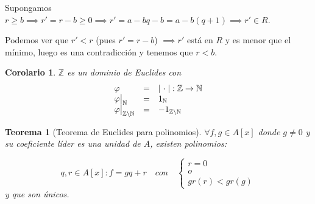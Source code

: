 \documentclass[11pt, a4paper, titlepage]{article}
\makeatletter
\newif\IfInSansMode
\let\oldsf\sffamily
\renewcommand*{\sffamily}{\oldsf\mathversion{sans}\InSansModetrue}
\let\oldnorm\normalfont
\renewcommand*{\normalfont}{\oldnorm\InSansModefalse\mathversion{normal}}
\renewenvironment{proof}[1][\proofname] {\vspace{-15pt}\par\pushQED{\qed}\normalfont\topsep6\p@\@plus6\p@\relax\trivlist\item[\hskip\labelsep\it#1\@addpunct{.}]\ignorespaces}{\popQED\endtrivlist\@endpefalse}
\providecommand{\ent}{\mathbb{Z}}
\providecommand{\nat}{\mathbb{N}}
\providecommand{\abs}[1]{\lvert#1\rvert}
\newcommand\restr[2]{{%
  \left.\kern-\nulldelimiterspace %
  #1 %
  \vphantom{\big|} %
  \right|_{#2} %
  }}
\renewenvironment{proof}[1][\proofname] {\par\pushQED{\qed}\normalfont\topsep6\p@\@plus6\p@\relax\trivlist\item[\hskip\labelsep\itshape\sffamily#1\@addpunct{.}]\ignorespaces}{\popQED\endtrivlist\@endpefalse}
\theoremstyle{theorem-style}
\newtheorem{nth}{Teorema}[section]
\newtheorem{ncor}{Corolario}[section]
\theoremstyle{definition-style}
\theoremstyle{remark-style}
\theoremstyle{example-style}
\makeatother
\begin{document}
\begin{proof}
\begin{itemize}
Supongamos $ r \geq b\implies r' = r-b \geq 0 \implies r' = a-bq -b = a -b(q+1)\implies r' \in R$.

Podemos ver que $r' < r$ (pues $r'=r-b$) $\implies  r'$ está en $R$ y es menor que el mínimo, luego es una contradicción y tenemos que $r < b$.

\end{itemize}




\end{proof}

\begin{ncor}
$\ent$ es un dominio de Euclides con
  \[
  \begin{array}{lll}
  \varphi & = & \abs{\;\cdot\;}: \ent \to \nat \\
  \restr{\varphi}{\nat} & = & 1_{\nat} \\
  \restr{\varphi}{\ent \setminus \nat} & = & -1_{\ent \setminus \nat}
\end{array}
\]
\end{ncor}

\begin{nth}[Teorema de Euclides para polinomios]
		$\forall f,g \in A[x]$ donde $g \neq 0 $ y su coeficiente líder es una unidad de $A$, existen polinomios:

	\[
	q,r \in A[x] : f = gq + r \quad con \quad
	 \begin{cases}
		r = 0\\
		o\\
		gr(r) < gr(g)
	\end{cases}
	\]
	y que son únicos.
\end{nth}
\end{document}
